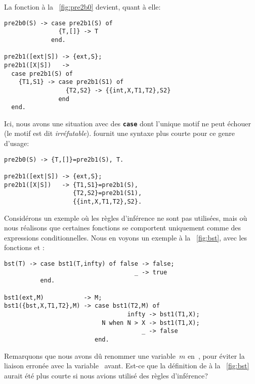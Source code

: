 La fonction à la \fig~\vref{fig:pre2b0} devient, quant à elle:
\begin{verbatim}
pre2b0(S) -> case pre2b1(S) of
               {T,[]} -> T
             end.

pre2b1([ext|S]) -> {ext,S};
pre2b1([X|S])   ->
  case pre2b1(S) of
    {T1,S1} -> case pre2b1(S1) of
                 {T2,S2} -> {{int,X,T1,T2},S2}
               end
  end.
\end{verbatim}
Ici, nous avons une situation avec des \texttt{\textbf{case}} dont
l'unique motif ne peut échouer (le motif est dit
\emph{irréfutable}). \Erlang fournit une syntaxe plus courte pour ce
genre d'usage:
\begin{verbatim}
pre2b0(S) -> {T,[]}=pre2b1(S), T.

pre2b1([ext|S]) -> {ext,S};
pre2b1([X|S])   -> {T1,S1}=pre2b1(S),
                   {T2,S2}=pre2b1(S1),
                   {{int,X,T1,T2},S2}.
\end{verbatim}
Considérons un exemple où les règles d'inférence ne sont pas
utilisées, mais où nous réalisons que certaines fonctions se
comportent uniquement comme des expressions conditionnelles. Nous en
voyons un exemple à la \fig~\vref{fig:bst}, avec les fonctions
 et :
\begin{verbatim}
bst(T) -> case bst1(T,infty) of false -> false;
                                    _ -> true
          end.

bst1(ext,M)           -> M;
bst1({bst,X,T1,T2},M) -> case bst1(T2,M) of
                                  infty -> bst1(T1,X);
                           N when N > X -> bst1(T1,X);
                                      _ -> false
                         end.
\end{verbatim}
Remarquons que nous avons dû renommer une variable~\(m\)
en~, pour éviter la liaison erronée avec la
variable~ avant. Est-ce que la définition de  à
la \fig~\ref{fig:bst} aurait été plus courte si nous avions utilisé
des règles d'inférence?


